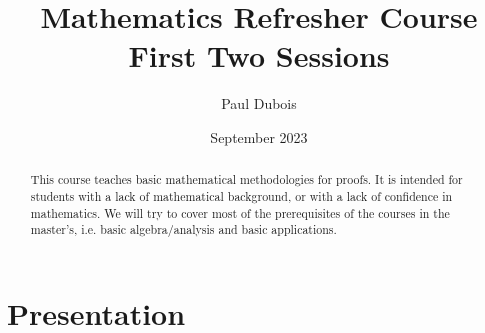 \documentclass[a4paper,12pt]{article}
\begin{document}
	
	\author{Paul Dubois}
	\title{Mathematics Refresher Course\\First Two Sessions}
	\date{September 2023}
	
	\maketitle
	
	\begin{abstract}
		This course teaches basic mathematical methodologies for proofs.
		It is intended for students with a lack of mathematical background, or with a lack of confidence in mathematics.
		We will try to cover most of the prerequisites of the courses in the master's, i.e. basic algebra/analysis and basic applications.
	\end{abstract}
	
	\section{Presentation}
	
\end{document}
